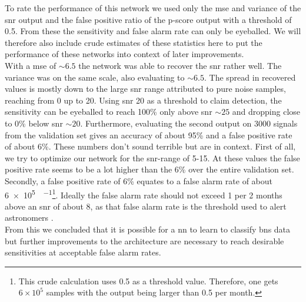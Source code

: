 To rate the performance of this network we used only the \gls{mse} and variance of the \gls{snr} output and the false positive ratio of the p-score output with a threshold of 0.5. From these the sensitivity and false alarm rate can only be eyeballed. We will therefore also include crude estimates of these statistics here to put the performance of these networks into context of later improvements.\\
With a \gls{mse} of $\sim 6.5$ the network was able to recover the \gls{snr} rather well. The variance was on the same scale, also evaluating to $\sim 6.5$. The spread in recovered values is mostly down to the large \gls{snr} range attributed to pure noise samples, reaching from 0 up to 20. Using \gls{snr} 20 as a threshold to claim detection, the sensitivity can be eyeballed to reach 100\% only above \gls{snr} $\sim 25$ and dropping close to 0\% below \gls{snr} $\sim 20$. Furthermore, evaluating the second output on 3000 signals from the validation set gives an accuracy of about 95\% and a false positive rate of about 6\%. These numbers don't sound terrible but are in context. First of all, we try to optimize our network for the \gls{snr}-range of 5-15. At these values the false positive rate seems to be a lot higher than the 6\% over the entire validation set. Secondly, a false positive rate of 6\% equates to a false alarm rate of about \SI[per-mode=fraction]{6e5}{\samples\per\month}\footnote{This crude calculation uses 0.5 as a threshold value. Therefore, one gets $6\times 10^5$ samples with the output being larger than 0.5 per month.}. Ideally the false alarm rate should not exceed 1 per 2 months above an \gls{snr} of about $8$, as that false alarm rate is the threshold used to alert astronomers \cite{pycbc_live}.\\
From this we concluded that it is possible for a \gls{nn} to learn to classify \gls{bns} data but further improvements to the architecture are necessary to reach desirable sensitivities at acceptable false alarm rates.
